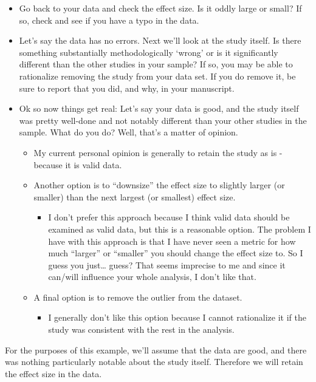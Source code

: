 \documentclass[
]{book}
\providecommand{\tightlist}{%
  \setlength{\itemsep}{0pt}\setlength{\parskip}{0pt}}
\begin{document}
\begin{itemize}
\item
  Go back to your data and check the effect size. Is it oddly large or small? If so, check and see if you have a typo in the data.
\item
  Let's say the data has no errors. Next we'll look at the study itself. Is there something substantially methodologically `wrong' or is it significantly different than the other studies in your sample? If so, you may be able to rationalize removing the study from your data set. If you do remove it, be sure to report that you did, and why, in your manuscript.
\item
  Ok so now things get real: Let's say your data is good, and the study itself was pretty well-done and not notably different than your other studies in the sample. What do you do? Well, that's a matter of opinion.

  \begin{itemize}
  \item
    My current personal opinion is generally to retain the study as is - because it is valid data.
  \item
    Another option is to ``downsize'' the effect size to slightly larger (or smaller) than the next largest (or smallest) effect size.

    \begin{itemize}
    \tightlist
    \item
      I don't prefer this approach because I think valid data should be examined as valid data, but this is a reasonable option. The problem I have with this approach is that I have never seen a metric for how much ``larger'' or ``smaller'' you should change the effect size to. So I guess you just\ldots{} guess? That seems imprecise to me and since it can/will influence your whole analysis, I don't like that.
    \end{itemize}
  \item
    A final option is to remove the outlier from the dataset.

    \begin{itemize}
    \tightlist
    \item
      I generally don't like this option because I cannot rationalize it if the study was consistent with the rest in the analysis.
    \end{itemize}
  \end{itemize}
\end{itemize}

For the purposes of this example, we'll assume that the data are good, and there was nothing particularly notable about the study itself. Therefore we will retain the effect size in the data.
\end{document}
